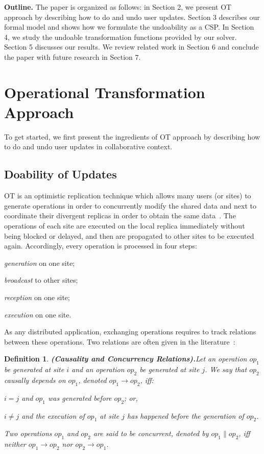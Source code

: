 \documentclass[submission,copyright,creativecommons]{eptcs}
\newtheorem{definition}{Definition}
\begin{document}
\medskip
\noindent\textbf{Outline.} The paper is organized as follows: in Section 2, we present  OT approach by describing how to do and undo user updates.
Section 3 describes our formal model and shows how we formulate the undoability as a CSP. In Section 4, we study the undoable transformation functions provided by our solver. Section 5 discusses our results.  
We review related work in Section 6 and conclude the paper with future research in Section 7.

 
 
\section{Operational Transformation Approach}  
To get started, we first present the ingredients of OT approach by describing how to do and undo
user updates in collaborative context.  

\subsection{Doability of Updates}\label{sec:do}
OT is an optimistic replication  technique which allows many users (or
sites) to generate operations in order to concurrently modify the  shared
data and next to coordinate
their divergent replicas in order to obtain the same  data~\cite{Ellis89,Sun98}. The operations
of each  site are  executed on the  local replica  immediately without
being blocked or delayed, and then are propagated to other sites to be
executed again.  Accordingly, every operation is processed in four steps:
\begin{inparaenum}[(i)]
\item \textit{generation} on one site;
\item \textit{broadcast} to other sites;
\item \textit{reception} on one site;
\item \textit{execution} on one site.
\end{inparaenum}

As any distributed application, exchanging operations requires to track relations
between these operations. Two relations are often given in the
literature~\cite{Ellis89,Sun98}:
\vspace{-0.1cm}
\begin{definition}\textbf{\emph{(Causality  and Concurrency Relations).}}\label{Def:caus}
Let an operation $op_1$ be generated at site $i$ and an  operation $op_2$
be generated at site $j$. We say that $op_2$ \emph{causally depends} on
$op_1$, denoted $op_1 \rightarrow op_2$, iff:
\begin{inparaenum}[(i)]
\item $i=j$ and $op_1$ was generated before $op_2$; or,
\item $i\neq j$ and the execution of $op_1$ at site $j$ has happened before
      the generation of $op_2$.
\end{inparaenum}
Two operations $op_1$ and $op_2$ are said to be \emph{concurrent},
denoted by $op_1 \parallel op_2$, iff neither $op_1 \rightarrow op_2$ nor
$op_2 \rightarrow op_1$.
\end{definition}
\end{document}
